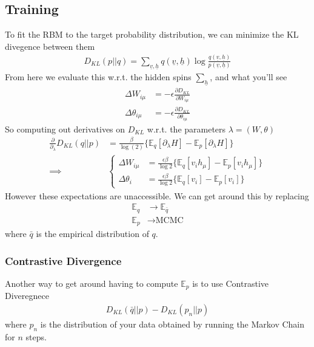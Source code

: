 \subsection{Training}
To fit the RBM to the target probability distribution, we can minimize the KL divegence between them
\begin{align}
	D_{KL}(p || q) = \sum_{\underline v, \underline h} q(\underline v, \underline h) \log \frac{q(\underline v , \underline h)}{p(\underline v, \underline h)}
\end{align}
From here we evaluate this w.r.t. the hidden spins $\sum_{\underline h}$, and what you'll see
\begin{align}
	\Delta W_{i \mu} &= - \epsilon \frac{\partial D_{KL}}{\partial W_{i\mu}}\\
	\Delta \theta_{i\mu} &= - \epsilon \frac{\partial D_{KL}}{\partial \theta_{i\mu}}
\end{align}
So computing out derivatives on $D_{KL}$ w.r.t. the parameters $\lambda = (W, \theta)$
\begin{align}
	\frac{\partial}{\partial_\lambda}D_{KL}(q || p) & = \frac{\beta}{\log(2)} \{ \mathbb E_q [\partial_\lambda H] - \mathbb E_p [\partial_\lambda H]\}\\
	\implies & \begin{cases}
		\Delta W_{i\mu} & = \frac{\epsilon \beta}{\log 2} \{ \mathbb E_q[v_i h_\mu] - \mathbb E_p [v_i h_\mu]\}\\
	\Delta \theta_i & = \frac{\epsilon \beta}{\log 2} \{ \mathbb E_q[v_i] - \mathbb E_p[v_i] \}
	\end{cases}
\end{align}
However these expectations are unaccessible. We can get around this by replacing
\begin{align}
	\mathbb E_q &\to \mathbb E_{\bar q}\\
	\mathbb E_p &\to\text{MCMC}
\end{align}
where $\bar q$ is the empirical distribution of $q$.
\subsubsection{Contrastive Divergence}
Another way to get around having to compute $\mathbb E_p$ is to use Contrastive Diveregnece
\begin{align}
	D_{KL}(\bar q || p ) - D_{KL}(p_n || p)
\end{align}
where $p_n$ is the distribution of your data obtained by running the Markov Chain for $n$ steps.

